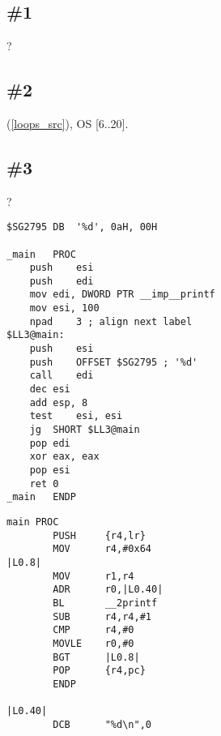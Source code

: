 \section{\Exercises}

\subsection{\Exercise \#1}

 \LOOP {}?

\subsection{\Exercise \#2}

(\ref{loops_src}), 
 \ac{OS}
 [6..20].

\subsection{\Exercise \#3}
\label{exercise_loops_3}

?

\begin{lstlisting}[caption=\Optimizing MSVC 2010]
$SG2795	DB	'%d', 0aH, 00H

_main	PROC
	push	esi
	push	edi
	mov	edi, DWORD PTR __imp__printf
	mov	esi, 100
	npad	3 ; align next label
$LL3@main:
	push	esi
	push	OFFSET $SG2795 ; '%d'
	call	edi
	dec	esi
	add	esp, 8
	test	esi, esi
	jg	SHORT $LL3@main
	pop	edi
	xor	eax, eax
	pop	esi
	ret	0
_main	ENDP
\end{lstlisting}

\begin{lstlisting}[caption=\NonOptimizingKeilVI (\ARMMode)]
main PROC
        PUSH     {r4,lr}
        MOV      r4,#0x64
|L0.8|
        MOV      r1,r4
        ADR      r0,|L0.40|
        BL       __2printf
        SUB      r4,r4,#1
        CMP      r4,#0
        MOVLE    r0,#0
        BGT      |L0.8|
        POP      {r4,pc}
        ENDP

|L0.40|
        DCB      "%d\n",0
\end{lstlisting}

